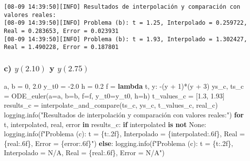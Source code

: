 \documentclass[
  letterpaper,
  DIV=11,
  numbers=noendperiod]{scrartcl}
\newenvironment{Shaded}{\begin{snugshade}}{\end{snugshade}}
\newcommand{\ControlFlowTok}[1]{\textcolor[rgb]{0.00,0.23,0.31}{\textbf{#1}}}
\newcommand{\DecValTok}[1]{\textcolor[rgb]{0.68,0.00,0.00}{#1}}
\newcommand{\FloatTok}[1]{\textcolor[rgb]{0.68,0.00,0.00}{#1}}
\newcommand{\KeywordTok}[1]{\textcolor[rgb]{0.00,0.23,0.31}{\textbf{#1}}}
\newcommand{\NormalTok}[1]{\textcolor[rgb]{0.00,0.23,0.31}{#1}}
\newcommand{\OperatorTok}[1]{\textcolor[rgb]{0.37,0.37,0.37}{#1}}
\newcommand{\SpecialCharTok}[1]{\textcolor[rgb]{0.37,0.37,0.37}{#1}}
\newcommand{\SpecialStringTok}[1]{\textcolor[rgb]{0.13,0.47,0.30}{#1}}
\newcommand{\StringTok}[1]{\textcolor[rgb]{0.13,0.47,0.30}{#1}}
\newcommand{\VariableTok}[1]{\textcolor[rgb]{0.07,0.07,0.07}{#1}}
\begin{document}
\begin{verbatim}
[08-09 14:39:50][INFO] Resultados de interpolación y comparación con valores reales:
[08-09 14:39:50][INFO] Problema (b): t = 1.25, Interpolado = 0.259722, Real = 0.283653, Error = 0.023931
[08-09 14:39:50][INFO] Problema (b): t = 1.93, Interpolado = 1.302427, Real = 1.490228, Error = 0.187801
\end{verbatim}

\subsubsection{\texorpdfstring{c) \(y(2.10)\) y
\(y(2.75)\)}{c) y(2.10) y y(2.75)}}\label{c-y2.10-y-y2.75}

\begin{Shaded}
\begin{Highlighting}[]
\NormalTok{a, b }\OperatorTok{=} \DecValTok{0}\NormalTok{, }\FloatTok{2.0}
\NormalTok{y\_t0 }\OperatorTok{=} \OperatorTok{{-}}\FloatTok{2.0}
\NormalTok{h }\OperatorTok{=} \FloatTok{0.2}
\NormalTok{f }\OperatorTok{=} \KeywordTok{lambda}\NormalTok{ t, y: }\OperatorTok{{-}}\NormalTok{(y }\OperatorTok{+} \DecValTok{1}\NormalTok{)}\OperatorTok{*}\NormalTok{(y }\OperatorTok{+} \DecValTok{3}\NormalTok{)}
\NormalTok{ys\_c, ts\_c }\OperatorTok{=}\NormalTok{ ODE\_euler(a}\OperatorTok{=}\NormalTok{a, b}\OperatorTok{=}\NormalTok{b, f}\OperatorTok{=}\NormalTok{f, y\_t0}\OperatorTok{=}\NormalTok{y\_t0, h}\OperatorTok{=}\NormalTok{h)}
\NormalTok{t\_values\_c }\OperatorTok{=}\NormalTok{ [}\FloatTok{1.3}\NormalTok{, }\FloatTok{1.93}\NormalTok{]}
\NormalTok{results\_c }\OperatorTok{=}\NormalTok{ interpolate\_and\_compare(ts\_c, ys\_c, t\_values\_c, real\_c)}
\NormalTok{logging.info(}\StringTok{"Resultados de interpolación y comparación con valores reales:"}\NormalTok{)}
\ControlFlowTok{for}\NormalTok{ t, interpolated, real, error }\KeywordTok{in}\NormalTok{ results\_c:}
    \ControlFlowTok{if}\NormalTok{ interpolated }\KeywordTok{is} \KeywordTok{not} \VariableTok{None}\NormalTok{:}
\NormalTok{        logging.info(}\SpecialStringTok{f"Problema (c): t = }\SpecialCharTok{\{}\NormalTok{t}\SpecialCharTok{:.2f\}}\SpecialStringTok{, Interpolado = }\SpecialCharTok{\{}\NormalTok{interpolated}\SpecialCharTok{:.6f\}}\SpecialStringTok{, Real = }\SpecialCharTok{\{}\NormalTok{real}\SpecialCharTok{:.6f\}}\SpecialStringTok{, Error = }\SpecialCharTok{\{}\NormalTok{error}\SpecialCharTok{:.6f\}}\SpecialStringTok{"}\NormalTok{)}
    \ControlFlowTok{else}\NormalTok{:}
\NormalTok{        logging.info(}\SpecialStringTok{f"Problema (c): t = }\SpecialCharTok{\{}\NormalTok{t}\SpecialCharTok{:.2f\}}\SpecialStringTok{, Interpolado = N/A, Real = }\SpecialCharTok{\{}\NormalTok{real}\SpecialCharTok{:.6f\}}\SpecialStringTok{, Error = N/A"}\NormalTok{)}
\end{Highlighting}
\end{Shaded}
\end{document}
